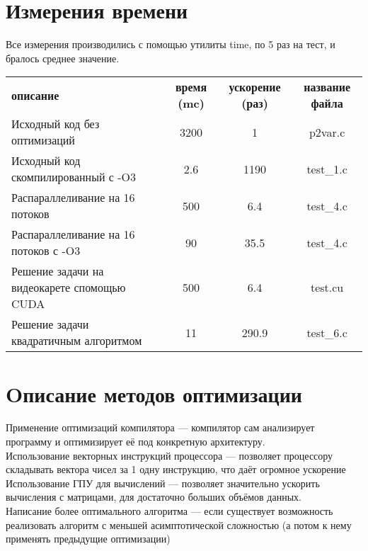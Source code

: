 \documentclass[a4peper, 12pt, titlepage, finall]{extreport}
\begin{document}
    \newpage
    \section{Измерения времени}
        Все измерения производились с помощью утилиты {\ttfamily time}, по 5 раз на тест, и бралось среднее значение.\\
            \begin{tabular}{lccc}
                \bf описание & \bf время (mc) & \bf ускорение (раз) &\bf название файла \\
                Исходный код без оптимизаций & 3200 & 1 &p2var.c \\
                Исходный код скомпилированный с {\ttfamily -O3} & 2.6 & 1190 & test\_1.c \\
                Распараллеливание на 16 потоков & 500 & 6.4 & test\_4.c \\
                Распараллеливание на 16 потоков с {\ttfamily -O3} & 90 & 35.5 & test\_4.c \\
                Решение задачи на видеокарете спомощью {\ttfamily CUDA} & 500 & 6.4 & test.cu \\
                Решение задачи квадратичным алгоритмом & 11 & 290.9 & test\_6.c \\
            \end{tabular}
       
    \section{Oписание методов оптимизации}
        Применение оптимизаций компилятора — компилятор сам анализирует программу и
        оптимизирует её под конкретную архитектуру. \\
        Использование векторных инструкций процессора — позволяет процессору складывать
        вектора чисел за 1 одну инструкцию, что даёт огромное ускорение\\
        Использование ГПУ для вычислений — позволяет значительно ускорить вычисления с
        матрицами, для достаточно больших объёмов данных.\\
        Написание более оптимального алгоритма — если существует возможность реализовать
        алгоритм с меньшей асимптотической сложностью (а потом к нему применять предыдущие
        оптимизации) \\
\end{document}

